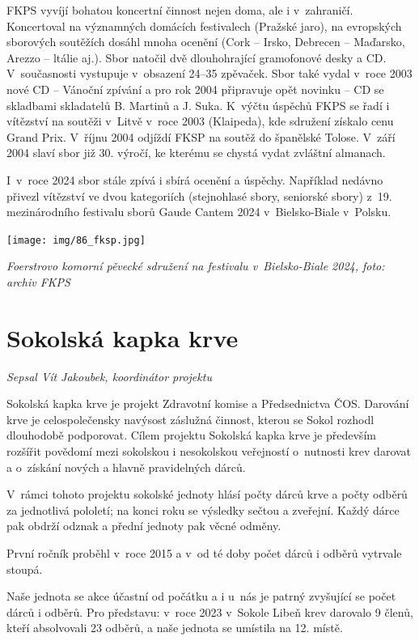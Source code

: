 \documentclass[a5paper, 11pt, twoside]{article}
\begin{document}
FKPS vyvíjí bohatou koncertní činnost nejen doma, ale i v~zahraničí.
Koncertoval na významných domácích festivalech (Pražské jaro), na
evropských sborových soutěžích dosáhl mnoha ocenění (Cork -- Irsko,
Debrecen -- Maďarsko, Arezzo -- ltálie aj.). Sbor natočil dvě
dlouhohrající gramofonové desky a CD. V~současnosti vystupuje v~obsazení
24--35 zpěvaček. Sbor také vydal v~roce 2003 nové CD -- Vánoční zpívání
a pro rok 2004 připravuje opět novinku -- CD se skladbami skladatelů B.
Martinů a J. Suka. K~výčtu úspěchů FKPS se řadí i vítězství na soutěži
v~Litvě v~roce 2003 (Klaipeda), kde sdružení získalo cenu Grand Prix.
V~říjnu 2004 odjíždí FKSP na soutěž do španělské Tolose. V~září 2004 slaví
sbor již 30. výročí, ke kterému se chystá vydat zvláštní almanach.

I~v~roce 2024 sbor stále zpívá i sbírá ocenění a úspěchy. Například
nedávno přivezl vítězství ve dvou kategoriích (stejnohlasé sbory,
seniorské sbory) z~19. mezinárodního festivalu sborů Gaude Cantem 2024
v~Bielsko-Biale v~Polsku.

 \texttt{[image: img/86\_fksp.jpg]}

\textit{Foerstrovo komorní pěvecké sdružení na festivalu v~Bielsko-Biale
2024, foto: archiv FKPS}

\section{Sokolská kapka krve}

\textit{Sepsal Vít Jakoubek, koordinátor projektu}

Sokolská kapka krve je projekt Zdravotní komise a Předsednictva ČOS.
Darování krve je celospolečensky navýsost záslužná činnost, kterou se
Sokol rozhodl dlouhodobě podporovat. Cílem projektu Sokolská kapka krve
je především rozšířit povědomí mezi sokolskou i nesokolskou veřejností
o~nutnosti krev darovat a o~získání nových a hlavně pravidelných dárců.

V~rámci tohoto projektu sokolské jednoty hlásí počty dárců krve a počty
odběrů za jednotlivá pololetí; na konci roku se výsledky sečtou a
zveřejní. Každý dárce pak obdrží odznak a přední jednoty pak věcné
odměny.

První ročník proběhl v~roce 2015 a v~od té doby počet dárců i odběrů
vytrvale stoupá.

Naše jednota se akce účastní od počátku a i u~nás je patrný zvyšující se
počet dárců i odběrů. Pro představu: v~roce 2023 v~Sokole Libeň krev
darovalo 9 členů, kteří absolvovali 23 odběrů, a naše jednota se
umístila na 12. místě.
\end{document}
